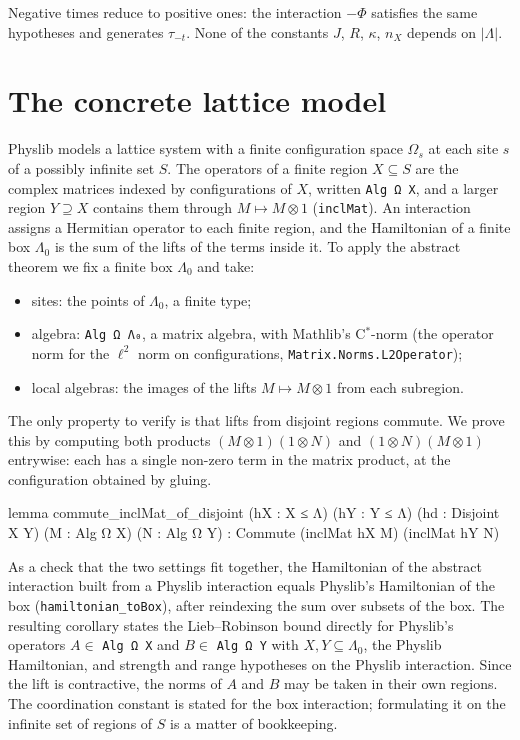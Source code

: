 \documentclass[11pt]{article}
\theoremstyle{definition}
\theoremstyle{remark}
\begin{document}
Negative times reduce to positive ones: the interaction $-\Phi$ satisfies the same hypotheses and
generates $\tau_{-t}$. None of the constants $J$, $R$, $\kappa$, $n_X$ depends on $|\Lambda|$.

\section{The concrete lattice model}\label{sec:lattice}

Physlib models a lattice system with a finite configuration space $\Omega_s$ at each site $s$ of a
possibly infinite set $S$. The operators of a finite region $X\subseteq S$ are the complex matrices
indexed by configurations of $X$, written \texttt{Alg Ω X}, and a larger region $Y\supseteq X$
contains them through $M\mapsto M\otimes1$ (\texttt{inclMat}). An interaction assigns a Hermitian
operator to each finite region, and the Hamiltonian of a finite box $\Lambda_0$ is the sum of the
lifts of the terms inside it. To apply the abstract theorem we fix a finite box $\Lambda_0$ and
take:
\begin{itemize}
  \item sites: the points of $\Lambda_0$, a finite type;
  \item algebra: \texttt{Alg Ω Λ₀}, a matrix algebra, with Mathlib's C$^*$-norm (the operator norm
  for the $\ell^2$ norm on configurations, \texttt{Matrix.Norms.L2Operator});
  \item local algebras: the images of the lifts $M\mapsto M\otimes1$ from each subregion.
\end{itemize}
The only property to verify is that lifts from disjoint regions commute. We prove this by
computing both products $(M\otimes1)(1\otimes N)$ and $(1\otimes N)(M\otimes1)$ entrywise: each
has a single non-zero term in the matrix product, at the configuration obtained by gluing.

\begin{lean}
lemma commute_inclMat_of_disjoint (hX : X ≤ Λ) (hY : Y ≤ Λ) (hd : Disjoint X Y)
    (M : Alg Ω X) (N : Alg Ω Y) : Commute (inclMat hX M) (inclMat hY N)
\end{lean}

As a check that the two settings fit together, the Hamiltonian of the abstract interaction
built from a Physlib interaction equals Physlib's Hamiltonian of the box
(\texttt{hamiltonian\_toBox}), after reindexing the sum over subsets of the box. The resulting
corollary states the Lieb--Robinson bound directly for Physlib's operators $A\in$ \texttt{Alg Ω X}
and $B\in$ \texttt{Alg Ω Y} with $X,Y\subseteq\Lambda_0$, the Physlib Hamiltonian, and strength
and range hypotheses on the Physlib interaction. Since the lift is contractive, the norms of $A$
and $B$ may be taken in their own regions. The coordination constant is stated for the box
interaction; formulating it on the infinite set of regions of $S$ is a matter of bookkeeping.
\end{document}
